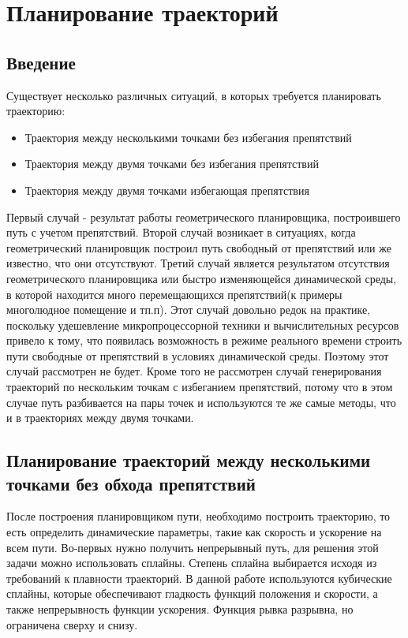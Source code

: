\chapter{Планирование траекторий} \label{ch:5}

\section{Введение} \label{sect5_1}
Существует несколько различных ситуаций, в которых требуется планировать траекторию:
\begin{itemize}
	\item Траектория между несколькими точками без избегания препятствий
	\item Траектория между двумя точками без избегания препятствий
	\item Траектория между двумя точками избегающая препятствия
\end{itemize}

Первый случай - результат работы геометрического планировщика, построившего путь с учетом препятствий.
Второй случай возникает в ситуациях, когда геометрический планировщик построил путь свободный от препятствий или же известно, что они отсутствуют.
Третий случай является результатом отсутствия геометрического планировщика или быстро изменяющейся динамической среды, в которой находится много перемещающихся препятствий(к примеры многолюдное помещение и тп.п). Этот случай довольно редок на практике, поскольку удешевление микропроцессорной техники и вычислительных ресурсов привело к тому, что появилась возможность в режиме реального времени строить пути свободные от препятствий в условиях динамической среды. Поэтому этот случай рассмотрен не будет. 
Кроме того не рассмотрен случай генерирования траекторий по нескольким точкам с избеганием препятствий, потому что в этом случае путь разбивается на пары точек и используются те же самые методы, что и в траекториях между двумя точками.

\section{Планирование траекторий между несколькими точками без обхода препятствий} \label{sect5_2}
После построения планировщиком пути, необходимо построить траекторию, то есть определить динамические параметры, такие как скорость и ускорение на всем пути. Во-первых нужно получить непрерывный путь, для решения этой задачи можно использовать сплайны. Степень сплайна выбирается исходя из требований к плавности траекторий. В данной работе используются кубические сплайны, которые обеспечивают гладкость функций положения и скорости, а также непрерывность функции ускорения. Функция рывка разрывна, но ограничена сверху и снизу.

